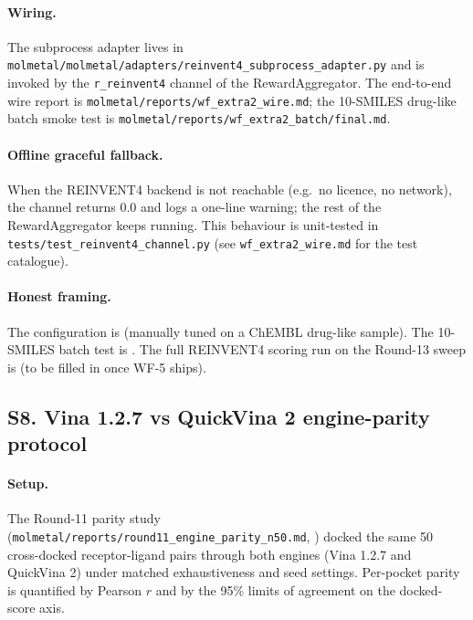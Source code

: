 \paragraph{Wiring.}
The subprocess adapter lives in
\texttt{molmetal/molmetal/adapters/reinvent4\_subprocess\_adapter.py}
and is invoked by the \texttt{r\_reinvent4} channel of the
RewardAggregator.  The end-to-end wire report is
\texttt{molmetal/reports/wf\_extra2\_wire.md}; the 10-SMILES
drug-like batch smoke test is
\texttt{molmetal/reports/wf\_extra2\_batch/final.md}.

\paragraph{Offline graceful fallback.}
When the REINVENT4 backend is not reachable (e.g.\ no licence, no
network), the channel returns $0.0$ and logs a one-line warning;
the rest of the RewardAggregator keeps running.  This behaviour is
unit-tested in \texttt{tests/test\_reinvent4\_channel.py} (see
\texttt{wf\_extra2\_wire.md} for the test catalogue).

\paragraph{Honest framing.}
The configuration is \DESIGN{} (manually tuned on a ChEMBL drug-like
sample).  The 10-SMILES batch test is \MEASURED{}.  The full
REINVENT4 scoring run on the Round-13 sweep is \DESIGN{} (to be
filled in once WF-5 ships).


\subsection*{S8. Vina 1.2.7 vs QuickVina 2 engine-parity protocol}
\label{supp:s8-vina-qv2}

\paragraph{Setup.}
The Round-11 parity study
(\texttt{molmetal/reports/round11\_engine\_parity\_n50.md},
\cite{footnote:round11_parity}) docked the same 50 cross-docked
receptor-ligand pairs through both engines (Vina 1.2.7 and QuickVina 2)
under matched exhaustiveness and seed settings.  Per-pocket parity is
quantified by Pearson $r$ and by the 95\% limits of agreement on the
docked-score axis.

